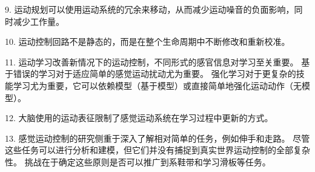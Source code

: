 9. 运动规划可以使用运动系统的冗余来移动，从而减少运动噪音的负面影响，同时减少工作量。


10. 运动控制回路不是静态的，而是在整个生命周期中不断修改和重新校准。


11. 运动学习改善新情况下的运动控制，不同形式的感官信息对学习至关重要。
基于错误的学习对于适应简单的感觉运动扰动尤为重要。
强化学习对于更复杂的技能学习尤为重要，它可以依赖模型（基于模型）或直接简单地强化运动动作（无模型）。


12. 大脑使用的运动表征限制了感觉运动系统在学习过程中更新的方式。


13. 感觉运动控制的研究侧重于深入了解相对简单的任务，例如伸手和走路。
尽管这些任务可以进行分析和建模，但它们并没有捕捉到真实世界运动控制的全部复杂性。
挑战在于确定这些原则是否可以推广到系鞋带和学习滑板等任务。


